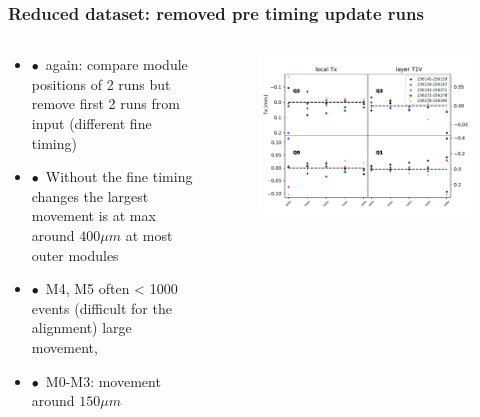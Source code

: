 \documentclass[aspectratio=1610, 12pt, xcolor=dvipsnames]{beamer}
\begin{document}
\begin{frame}\frametitle{Reduced dataset: removed pre timing update runs}
  \begin{columns}
    \begin{column}[c]{0.48\textwidth}
      \begin{itemize}
        \item $\bullet$\, again: compare module positions of 2 runs but remove first 2 runs from input (different fine timing)
        \item $\bullet$\, Without the fine timing changes the largest movement is at max around $400 \mu m$ at most outer modules
        \item $\bullet$\, M4, M5 often < 1000 events (difficult for the alignment) \to large movement,
        \item $\bullet$\, M0-M3: movement around $150 \mu m$
      \end{itemize}
    \end{column}
      \begin{column}[c]{0.48\textwidth}
        \begin{figure}
          \includegraphics[width=\textwidth]{plots/stability_plots/diff_reduced_Tx_T1V_Tx.pdf}
        \end{figure}
      \end{column}
  \end{columns}
\end{frame}
\end{document}
